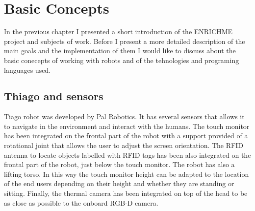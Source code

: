 \chapter{Basic Concepts}
\label{chapter:basic}
In the previous chapter I presented a short introduction of the ENRICHME project and subjects of work.
Before I present a more detailed description of the main goals and the implementation of them I would like
to discuss about the basic conecepts of working with robots and of the tehnologies and programing languages used.

\section{Thiago and sensors}
\label{sec:thiago}


Tiago robot was developed by Pal Robotics. It has several sensors that
allows it to navigate in the environment and interact with the humans. 
The touch monitor has been integrated on the frontal part of the robot
with a support provided of a rotational joint that allows the user to
adjust the screen orientation. The RFID antenna to locate objects labelled
with RFID tags has been also integrated on the frontal part of the robot,
just below the touch monitor. The robot has also a lifting torso. In
this way the touch monitor height can be adapted to the location of 
the end users depending on their height and whether they are standing
or sitting. Finally, the thermal camera has been integrated on top of
the head to be as close as possible to the onboard RGB-D camera.



